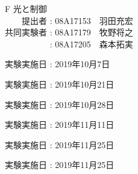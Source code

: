 \documentclass[11pt, a4paper,twocolumn]{jarticle}
\begin{document}
\begin{titlepage}
  \begin{center}
    {\Huge F 光と制御}\\
    \vspace{30truept}
    {\huge 　　提出者 : 08A17153　羽田充宏}\\ %
    {\huge 共同実験者 : 08A17179　牧野将之}\\
    {\huge 　　　　　 : 08A17205　森本拓実}\\ %
    \vspace{50truept}

    \begin{list}{}{\setlength{\leftmargin}{95pt}}
    \item {\huge 実験実施日 : 2019年10月7日}\\
    \vspace{10truept}
    \item {\huge 実験実施日 : 2019年10月21日}\\
    \vspace{10truept}
    \item {\huge 実験実施日 : 2019年10月28日}\\
    \vspace{10truept}
    \item {\huge 実験実施日 : 2019年11月11日}\\
    \vspace{10truept}
    \item {\huge 実験実施日 : 2019年11月25日}\\
    \vspace{10truept}
    \item {\huge 実験実施日 : 2019年11月25日}\\
    \vspace{40truept}

    \end{list}
    \vspace{50truept}

  \end{center}
\end{titlepage}
\end{document}

